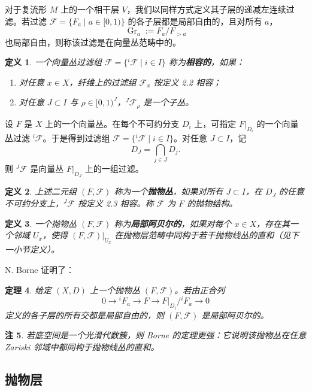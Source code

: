 \documentclass[12pt,a4paper]{article}
\newtheorem{theorem}{定理}[section]
\newtheorem{definition}[theorem]{定义}
\newtheorem{remark}[theorem]{注}
\newcommand{\Gr}{\operatorname{Gr}}
\begin{document}
对于复流形 \(M\) 上的一个相干层 \(V\)，我们以同样方式定义其子层的递减左连续过滤。若过滤 \(\mathcal F=\{F_a\mid a\in[0,1)\}\) 的各子层都是局部自由的，且对所有 \(a\)，
\[
\Gr_a:=F_a/F_{>a}
\]
也局部自由，则称该过滤是在向量丛范畴中的。

\begin{definition}
一个向量丛过滤组 \(\mathcal F=\{{}^i\mathcal F\mid i\in I\}\) 称为\textbf{相容的}，如果：
\begin{enumerate}[label=\arabic*.]
\item 对任意 \(x\in X\)，纤维上的过滤组 \(\mathcal F_x\) 按定义 2.2 相容；
\item 对任意 \(J\subset I\) 与 \(\rho\in[0,1)^J\)，\({}^J\mathcal F_\rho\) 是一个子丛。
\end{enumerate}
\end{definition}

设 \(F\) 是 \(X\) 上的一个向量丛。在每个不可约分支 \(D_i\) 上，可指定 \(F|_{D_i}\) 的一个向量丛过滤 \({}^i\mathcal F\)。于是得到过滤组 \(\mathcal F=\{{}^i\mathcal F\mid i\in I\}\)。对任意 \(J\subset I\)，记
\[
D_J=\bigcap_{j\in J}D_j.
\]
则 \({}^J\mathcal F\) 是向量丛 \(F|_{D_J}\) 上的一组过滤。

\begin{definition}
上述二元组 \((F,\mathcal F)\) 称为一个\textbf{抛物丛}，如果对所有 \(J\subset I\)，在 \(D_J\) 的任意不可约分支上，\({}^J\mathcal F\) 按定义 2.3 相容。称 \(\mathcal F\) 为 \(F\) 的抛物结构。
\end{definition}

\begin{definition}
一个抛物丛 \((F,\mathcal F)\) 称为\textbf{局部阿贝尔的}，如果对每个 \(x\in X\)，存在其一个邻域 \(U_x\)，使得 \((F,\mathcal F)|_{U_x}\) 在抛物层范畴中同构于若干抛物线丛的直和（见下一小节定义）。
\end{definition}

N. Borne \cite{Borne} 证明了：

\begin{theorem}
给定 \((X,D)\) 上一个抛物丛 \((F,\mathcal F)\)。若由正合列
\[
0\to {}^iF_a\to F\to F|_{D_i}/{}^iF_a\to 0
\]
定义的各子层的所有交都是局部自由的，则 \((F,\mathcal F)\) 是局部阿贝尔的。
\end{theorem}

\begin{remark}
若底空间是一个光滑代数簇，则 Borne 的定理更强：它说明该抛物丛在任意 Zariski 邻域中都同构于抛物线丛的直和。
\end{remark}

\subsection{抛物层}
\end{document}
